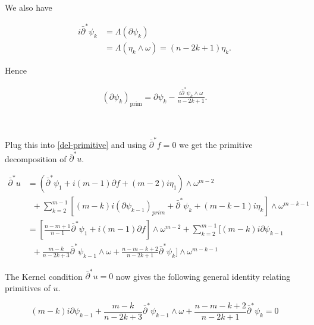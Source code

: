 \documentclass[10pt,a4paper]{amsart}
\newcommand{\sbpartial}{\bar{\partial}^*}
\numberwithin{equation}{section}
\begin{document}
\

We also have

\begin{equation}
    \begin{aligned}
        i \sbpartial \psi_k &= \Lambda(\partial \psi_k) \\
        &= \Lambda(\eta_k \wedge \omega) = (n-2k+1) \eta_k.
    \end{aligned}
\end{equation}

Hence

\begin{equation}
    \begin{aligned}
        (\partial \psi_k)_{\text{prim}} = \partial \psi_k - \frac{i \sbpartial \psi_k \wedge \omega}{n-2k+1}.
    \end{aligned}
\end{equation}

\


Plug this into \eqref{del-primitive} and using $\sbpartial f  =0$ we get the primitive decomposition of $\sbpartial u$.

\begin{equation}
    \begin{aligned}
        \sbpartial u &= (\sbpartial \psi_1 + i(m-1)\partial f + (m-2)i \eta_1) \wedge \omega^{m-2} \\
        &\;\;+ \sum_{k=2}^{m-1}\left[(m-k)i(\partial \psi_{k-1})_{prim} + \sbpartial \psi_{k} + (m-k-1)i\eta_{k}\right]\wedge\omega^{m-k-1}\\
        &=\left[\frac{n-m+1}{n-1}\sbpartial \psi_1 + i(m-1)\partial f \right] \wedge \omega^{m-2}+ \sum_{k=2}^{m-1}\Big[ (m-k)i\partial \psi_{k-1} \\
        &\;\;+ \frac{m-k}{n-2k+ 3} \sbpartial \psi_{k-1} \wedge \omega + \frac{n-m-k+2}{n-2k+1}\sbpartial \psi_{k} \Big]\wedge\omega^{m-k-1}
    \end{aligned}
\end{equation}

The Kernel condition $\sbpartial u =0 $ now gives the following general identity relating primitives of $u$.

\begin{equation}\label{cascade}
    (m-k)i\partial \psi_{k-1} + \frac{m-k}{n-2k+ 3} \sbpartial \psi_{k-1} \wedge \omega + \frac{n-m-k+2}{n-2k+1}\sbpartial \psi_{k} = 0
\end{equation}



\
\end{document}
